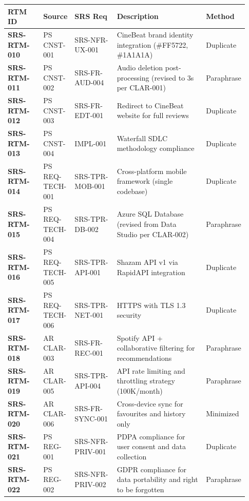 \documentclass[12pt, a4paper]{article}
\begin{document}
\begin{longtable}[]{@{}
  >{\raggedright\arraybackslash}p{0.15\linewidth}
  >{\raggedright\arraybackslash}p{0.12\linewidth}
  >{\raggedright\arraybackslash}p{0.18\linewidth}
  >{\raggedright\arraybackslash}p{0.38\linewidth}
  >{\raggedright\arraybackslash}p{0.10\linewidth}@{}}
\toprule
\textbf{RTM ID} & \textbf{Source} & \textbf{SRS Req} &
\textbf{Description} & \textbf{Method} \\
\midrule
\endhead
\bottomrule
\endlastfoot
\textbf{SRS-RTM-010} & PS CNST-001 & SRS-NFR-UX-001 & CineBeat brand identity integration (\#FF5722, \#1A1A1A) & Duplicate \\
\textbf{SRS-RTM-011} & PS CNST-002 & SRS-FR-AUD-004 & Audio deletion post-processing (revised to 3s per CLAR-001) & Paraphrase \\
\textbf{SRS-RTM-012} & PS CNST-003 & SRS-FR-EDT-001 & Redirect to CineBeat website for full reviews & Duplicate \\
\textbf{SRS-RTM-013} & PS CNST-004 & IMPL-001 & Waterfall SDLC methodology compliance & Duplicate \\
\textbf{SRS-RTM-014} & PS REQ-TECH-001 & SRS-TPR-MOB-001 & Cross-platform mobile framework (single codebase) & Duplicate \\
\textbf{SRS-RTM-015} & PS REQ-TECH-004 & SRS-TPR-DB-002 & Azure SQL Database (revised from Data Studio per CLAR-002) & Paraphrase \\
\textbf{SRS-RTM-016} & PS REQ-TECH-005 & SRS-TPR-API-001 & Shazam API v1 via RapidAPI integration & Duplicate \\
\textbf{SRS-RTM-017} & PS REQ-TECH-006 & SRS-TPR-NET-001 & HTTPS with TLS 1.3 security & Duplicate \\
\textbf{SRS-RTM-018} & AR CLAR-003 & SRS-FR-REC-001 & Spotify API + collaborative filtering for recommendations & Paraphrase \\
\textbf{SRS-RTM-019} & AR CLAR-005 & SRS-TPR-API-004 & API rate limiting and throttling strategy (100K/month) & Paraphrase \\
\textbf{SRS-RTM-020} & AR CLAR-006 & SRS-FR-SYNC-001 & Cross-device sync for favourites and history only & Minimized \\
\textbf{SRS-RTM-021} & PS REG-001 & SRS-NFR-PRIV-001 & PDPA compliance for user consent and data collection & Duplicate \\
\textbf{SRS-RTM-022} & PS REG-002 & SRS-NFR-PRIV-002 & GDPR compliance for data portability and right to be forgotten & Paraphrase \\
\end{longtable}
\end{document}
